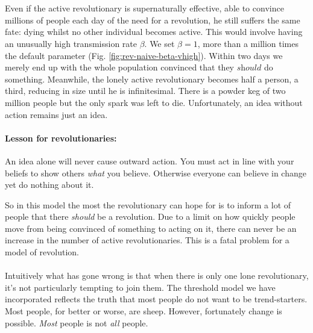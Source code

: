 \\
\\
Even if the active revolutionary is supernaturally effective, able to convince millions of people each day of the need for a revolution, he still suffers the same fate: dying whilst no other individual becomes active. This would involve having an unusually high transmission rate $\beta$. We set $\beta=1$, more than a million times the default parameter (Fig. \ref{fig:rev-naive-beta-vhigh}). Within two days we merely end up with the whole population convinced that they $\textit{should}$ do something. Meanwhile, the lonely active revolutionary becomes half a person, a third, reducing in size until he is infinitesimal. There is a powder keg of two million people but the only spark was left to die. Unfortunately, an idea without action remains just an idea.
%
\begin{tcolorbox}
	\paragraph{Lesson for revolutionaries:} An idea alone will never cause outward action. You must act in line with your beliefs to show others \textit{what} you believe. Otherwise everyone can believe in change yet do nothing about it.
\end{tcolorbox}
So in this model the most the revolutionary can hope for is to inform a lot of people that there \textit{should} be a revolution. Due to a limit on how quickly people move from being convinced of something to acting on it, there can never be an increase in the number of active revolutionaries.  This is a fatal problem for a model of revolution.\\
\\
Intuitively what has gone wrong is that when there is only one lone revolutionary, it's not particularly tempting to join them. The threshold model we have incorporated reflects the truth that most people do not want to be trend-starters. Most people, for better or worse, are sheep. However, fortunately change is possible. \textit{Most} people is not \textit{all} people.
